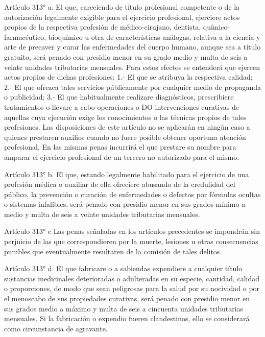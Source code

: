     Artículo 313° a. El que, careciendo de título profesional competente o de la autorización legalmente exigible para el ejercicio profesional, ejerciere actos propios de la respectiva profesión de médico-cirujano, dentista, químico-farmacéutico, bioquímico u otra de características análogas, relativa a la ciencia y arte de precaver y curar las enfermedades del cuerpo humano, aunque sea a título gratuito, será penado con presidio menor en su grado medio y multa de seis a veinte unidades tributarias mensuales.
    Para estos efectos se entenderá que ejercen actos propios de dichas profesiones:
    1.- El que se atribuya la respectiva calidad;
    2.- El que ofrezca tales servicios públicamente por cualquier medio de propaganda o publicidad;
    3.- El que habitualmente realizare diagnósticos, prescribiere tratamientos o llevare a cabo operaciones o DO intervenciones curativas de aquellas cuya ejecución exige los conocimientos o las técnicas propios de tales profesiones.
    Las disposiciones de este artículo no se aplicarán en ningún caso a quienes prestaren auxilios cuando no fuere posible obtener oportuna atención profesional.
    En las mismas penas incurrirá el que prestare su nombre para amparar el ejercicio profesional de un tercero no autorizado para el mismo.



    Artículo 313° b. El que, estando legalmente habilitado para el ejercicio de una profesión médica o auxiliar de ella ofreciere abusando de la credulidad del público, la prevención o curación de enfermedades o defectos por fórmulas ocultas o sistemas infalibles, será penado con presidio menor en sus grados mínimo a medio y multa de seis a veinte unidades tributarias mensuales.






    Artículo 313° c Las penas señaladas en los artículos precedentes se impondrán sin perjuicio de las que correspondieren por la muerte, lesiones u otras consecuencias punibles que eventualmente resultaren de la comisión de tales delitos.

    Artículo 313° d. El que fabricare o a sabiendas expendiere a cualquier título sustancias medicinales deterioradas o adulteradas en su especie, cantidad, calidad o proporciones, de modo que sean peligrosas para la salud por su nocividad o por el menoscabo de sus propiedades curativas, será penado con presidio menor en sus grados medio a máximo y multa de seis a cincuenta unidades tributarias mensuales.
    Si la fabricación o expendio fueren clandestinos, ello se considerará como circunstancia de agravante.



